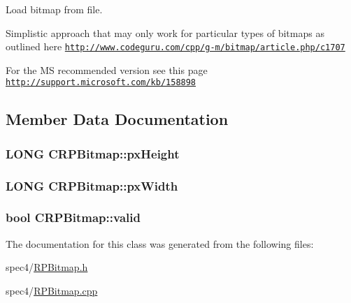Load bitmap from file. 

Simplistic approach that may only work for particular types of bitmaps as outlined here \href{http://www.codeguru.com/cpp/g-m/bitmap/article.php/c1707}{\tt http://www.codeguru.com/cpp/g-\/m/bitmap/article.php/c1707}

For the MS recommended version see this page \href{http://support.microsoft.com/kb/158898}{\tt http://support.microsoft.com/kb/158898} 

\subsection{Member Data Documentation}
\hypertarget{classCRPBitmap_a5a9552e0c377152216906754d71fb0f5}{
\subsubsection[{pxHeight}]{\setlength{\rightskip}{0pt plus 5cm}LONG {\bf CRPBitmap::pxHeight}}}
\label{classCRPBitmap_a5a9552e0c377152216906754d71fb0f5}
\hypertarget{classCRPBitmap_ad350f7f01d406da20ce9cde855008ff8}{
\subsubsection[{pxWidth}]{\setlength{\rightskip}{0pt plus 5cm}LONG {\bf CRPBitmap::pxWidth}}}
\label{classCRPBitmap_ad350f7f01d406da20ce9cde855008ff8}
\hypertarget{classCRPBitmap_ad535c2abe5b4cd56543b5cb1ae7d92a9}{
\subsubsection[{valid}]{\setlength{\rightskip}{0pt plus 5cm}bool {\bf CRPBitmap::valid}}}
\label{classCRPBitmap_ad535c2abe5b4cd56543b5cb1ae7d92a9}


The documentation for this class was generated from the following files:\begin{DoxyCompactItemize}
\item 
spec4/\hyperlink{RPBitmap_8h}{RPBitmap.h}\item 
spec4/\hyperlink{RPBitmap_8cpp}{RPBitmap.cpp}\end{DoxyCompactItemize}
